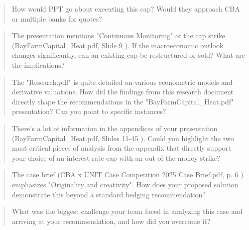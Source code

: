 \documentclass[11pt, a4paper, british]{article}
\begin{document}
\begin{quote}
    How would PPT go about executing this cap? Would they approach CBA or multiple banks for quotes?
\end{quote}

\newpage

\begin{quote}
    The presentation mentions "Continuous Monitoring" of the cap strike (BayFarmCapital_Heat.pdf, Slide 9 ). If the macroeconomic outlook changes significantly, can an existing cap be restructured or sold? What are the implications?
\end{quote}

\newpage

\begin{quote}
    The "Research.pdf" is quite detailed on various econometric models and derivative valuations. How did the findings from this research document directly shape the recommendations in the "BayFarmCapital_Heat.pdf" presentation? Can you point to specific instances?
\end{quote}

\newpage

\begin{quote}
    There's a lot of information in the appendices of your presentation (BayFarmCapital_Heat.pdf, Slides 11-45 ). Could you highlight the two most critical pieces of analysis from the appendix that directly support your choice of an interest rate cap with an out-of-the-money strike?
\end{quote}

\newpage

\begin{quote}
    The case brief (CBA x UNIT Case Competition 2025 Case Brief.pdf, p. 6 ) emphasizes "Originality and creativity". How does your proposed solution demonstrate this beyond a standard hedging recommendation?
\end{quote}

\newpage

\begin{quote}
    What was the biggest challenge your team faced in analyzing this case and arriving at your recommendation, and how did you overcome it?
\end{quote}

\newpage

\printbibliography
\end{document}
